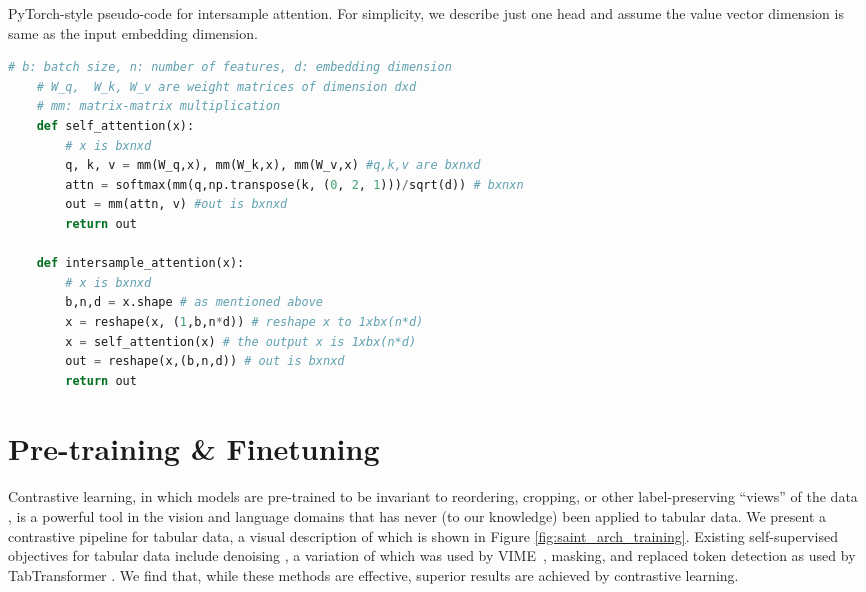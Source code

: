 \documentclass{article}
\begin{document}
\begin{algorithm}[tb]
\captionsetup{font=small}
   \caption{PyTorch-style pseudo-code for intersample attention. For simplicity, we describe just one head and assume the value vector dimension is same as the input embedding dimension.}
   \label{alg:MISA}
   
    \begin{lstlisting}[language=python]
    # b: batch size, n: number of features, d: embedding dimension 
    # W_q,  W_k, W_v are weight matrices of dimension dxd
    # mm: matrix-matrix multiplication
    def self_attention(x):
        # x is bxnxd
        q, k, v = mm(W_q,x), mm(W_k,x), mm(W_v,x) #q,k,v are bxnxd
        attn = softmax(mm(q,np.transpose(k, (0, 2, 1)))/sqrt(d)) # bxnxn
        out = mm(attn, v) #out is bxnxd
        return out
        
    def intersample_attention(x):
        # x is bxnxd
        b,n,d = x.shape # as mentioned above
        x = reshape(x, (1,b,n*d)) # reshape x to 1xbx(n*d)
        x = self_attention(x) # the output x is 1xbx(n*d)
        out = reshape(x,(b,n,d)) # out is bxnxd
        return out
    \end{lstlisting}
\end{algorithm}

\section{Pre-training \& Finetuning}
\label{sec:pretraining}



Contrastive learning, in which models are pre-trained to be invariant to reordering, cropping, or other label-preserving ``views'' of the data~%
\cite{chen2020simple,he2020momentum,pathak2016context,grill2020bootstrap,vincent2008extracting}, is a powerful tool in the vision and language domains that has never (to our knowledge) been applied to tabular data.   %
We present a contrastive pipeline for tabular data, a visual description of which is shown in Figure \ref{fig:saint_arch_training}.
Existing self-supervised objectives for tabular data include denoising \citep{vincent2008extracting}, a variation of which was used by VIME~\citep{yoon2020vime}, masking, and replaced token detection as used by TabTransformer \citep{huang2020tabtransformer}. We find that, while these methods are effective, superior results are achieved by contrastive learning.
\end{document}
